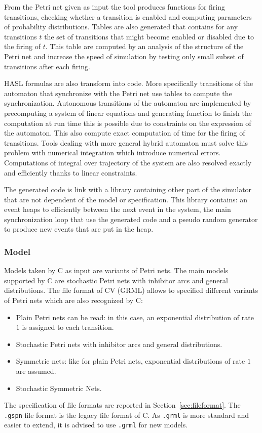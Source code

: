 \documentclass{article}
\newcommand{\cosmos}{\mbox{\textup{C}\scalebox{0.75}{{\textsc{OSMOS}}}}}
\newcommand{\cosyverif}{\mbox{\textup{C}\scalebox{0.75}{{\textsc{OSY}}}\textup{V}\scalebox{0.75}{{\textsc{ERIF}}}}}
\begin{document}
From the Petri net given as input the tool produces functions for
firing transitions, checking whether a transition is enabled and
computing parameters of probability distributions. Tables are also
generated that contains for any transitions $t$ the set of transitions
that might become enabled or disabled due to the firing of $t$. This
table are computed by an analysis of the structure of the Petri net
and increase the speed of simulation by testing only small subset of
transitions after each firing.

HASL formulas are also transform into code. More specifically
transitions of the automaton that synchronize with the Petri net use
tables to compute the synchronization. Autonomous transitions of the
automaton are implemented by precomputing a system of linear equations
and generating function to finish the computation at run time this is
possible due to constraints on the expression of the automaton. This
also compute exact computation of time for the firing of
transitions. Tools dealing with more general hybrid automaton must
solve this problem with numerical integration which introduce
numerical errors. Computations of integral over trajectory of the
system are also resolved exactly and efficiently thanks to linear
constraints.

The generated code is link with a library containing other part
of the simulator that are not dependent of the model or specification.
This library contains: an event heaps to efficiently between the next event
in the system, the main synchronization loop that use the generated code
and a pseudo random generator to produce new events that are put in the heap.

\subsubsection{Model}
Models taken by \cosmos{} as input are variants of Petri nets.  The main
models supported by \cosmos{} are stochastic Petri nets with inhibitor
arcs and general distributions. The file format of \cosyverif{} (GRML) 
allows to specified different variants of Petri nets which are also 
recognized by \cosmos{}:
\begin{itemize}
\item Plain Petri nets can be read: in this case, an exponential
  distribution of rate $1$ is assigned to each transition.
\item Stochastic Petri nets with inhibitor arcs and general distributions.
\item Symmetric nets: like for plain Petri nets, exponential
  distributions of rate $1$ are assumed.
\item Stochastic Symmetric Nets. 
\end{itemize}
The specification of file formats are reported in Section~\ref{sec:fileformat}.
The \verb|.gspn| file format is the legacy file format of \cosmos{}. As \verb|.grml|
is more standard and easier to extend, it is advised to use \verb|.grml| for new
models.
\end{document}
